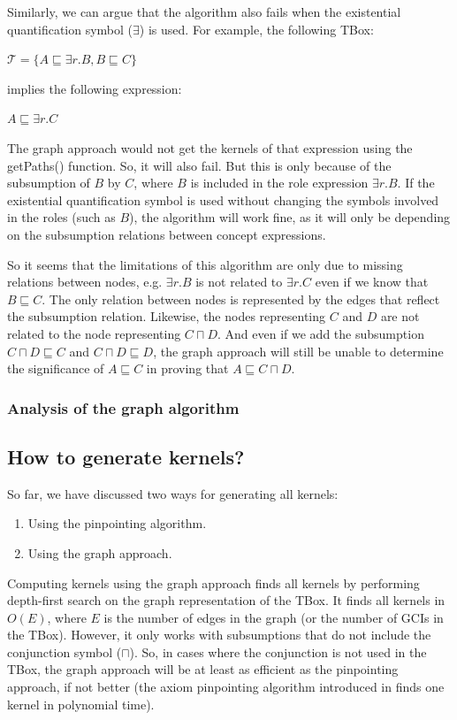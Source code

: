 Similarly, we can argue that the algorithm also fails when the existential quantification symbol ($\exists$) is used. For example, the following TBox:
\begin{center}
$\mathcal{T} = \lbrace A \sqsubseteq \exists r.B, B \sqsubseteq C \rbrace$
\end{center}
implies the following expression:
\begin{center}
$A \sqsubseteq \exists r.C$
\end{center}
The graph approach would not get the kernels of that expression using the getPaths() function. So, it will also fail. But this is only because of the subsumption of $B$ by $C$, where $B$ is included in the role expression $\exists r.B$. If the existential quantification symbol is used without changing the symbols involved in the roles (such as $B$), the algorithm will work fine, as it will only be depending on the subsumption relations between concept expressions.

So it seems that the limitations of this algorithm are only due to missing relations between nodes, e.g. $\exists r.B$ is not related to $\exists r.C$ even if we know that $B \sqsubseteq C$. The only relation between nodes is represented by the edges that reflect the subsumption relation. Likewise, the nodes representing $C$ and $D$ are not related to the node representing $C \sqcap D$. And even if we add the subsumption $C \sqcap D \sqsubseteq C$ and $C \sqcap D \sqsubseteq D$, the graph approach will still be unable to determine the significance of $A \sqsubseteq C$ in proving that $A \sqsubseteq C \sqcap D$.


\subsubsection{Analysis of the graph algorithm}


\subsection{How to generate kernels?}
So far, we have discussed two ways for generating all kernels:
\begin{enumerate}
\item Using the pinpointing algorithm.
\item Using the graph approach.
\end{enumerate}
Computing kernels using the graph approach finds all kernels by performing depth-first search on the graph representation of the TBox. It finds all kernels in $O(E)$, where $E$ is the number of edges in the graph (or the number of GCIs in the TBox). However, it only works with subsumptions that do not include the conjunction symbol ($\sqcap$). So, in cases where the conjunction is not used in the TBox, the graph approach will be at least as efficient as the pinpointing approach, if not better (the axiom pinpointing algorithm introduced in \cite{pin} finds one kernel in polynomial time).


